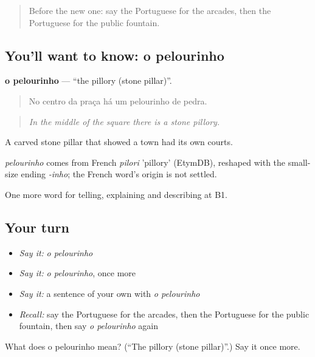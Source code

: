 \label{lesson:PT-C441-pelourinho}



\begin{quote}
Before the new one: say the Portuguese for the arcades, then the Portuguese for the public fountain.
\end{quote}

\subsection*{You'll want to know: o pelourinho}
\textbf{o pelourinho} — \textquotedblleft{}the pillory (stone pillar)\textquotedblright{}.

\begin{quote}
No centro da praça há um pelourinho de pedra.
\end{quote}

\begin{quote}
\emph{In the middle of the square there is a stone pillory.}
\end{quote}

A carved stone pillar that showed a town had its own courts.

\begin{cousinweb}
\emph{pelourinho} comes from French \emph{pilori} 'pillory' (EtymDB), reshaped with the small-size ending \emph{-inho}; the French word's origin is not settled.
\end{cousinweb}

\begin{grammarlens}[title={What you've built}]
One more word for telling, explaining and describing at B1.
\end{grammarlens}

\subsection*{Your turn}
\begin{itemize}
\raggedright
  \item \emph{Say it:} \emph{o pelourinho}
  \item \emph{Say it:} \emph{o pelourinho}, once more
  \item \emph{Say it:} a sentence of your own with \emph{o pelourinho}
  \item \emph{Recall:} say the Portuguese for the arcades, then the Portuguese for the public fountain, then say \emph{o pelourinho} again
\end{itemize}

\begin{tcolorbox}[breakable,colback=teal!4,colframe=teal!35!black,title={Before you move on}]
What does o pelourinho mean? (\textquotedblleft{}The pillory (stone pillar)\textquotedblright{}.) Say it once more.
\end{tcolorbox}
